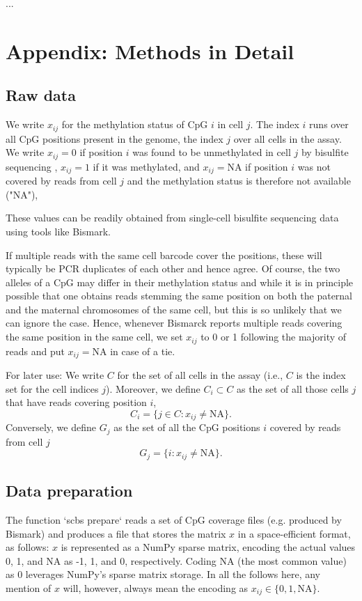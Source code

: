 \documentclass[twocolumn,10pt]{article}
\begin{document}
...

\appendix

\section{Appendix: Methods in Detail}

\subsection{Raw data}

We write $x_{ij}$ for the methylation status of CpG $i$ in cell $j$. The index $i$ runs over all CpG positions present in the genome, the index $j$ over all cells in the assay. We write $x_{ij}=0$ if position $i$ was found to be unmethylated in cell $j$ by bisulfite sequencing , $x_{ij}=1$ if it was methylated, and $x_{ij}=\text{NA}$ if position $i$ was not covered by reads from cell $j$ and the methylation status is therefore not available ("NA"),

These values can be readily obtained from single-cell bisulfite sequencing data using tools like Bismark.

If multiple reads with the same cell barcode cover the positions, these will typically be PCR duplicates of each other and hence agree. Of course, the two alleles of a CpG may differ in their methylation status and while it is in principle possible that one obtains reads stemming the same position on both the paternal and the maternal chromosomes of the same cell, but this is so unlikely that we can ignore the case. Hence, whenever Bismarck reports multiple reads covering the same position in the same cell, we set $x_{ij}$ to 0 or 1 following the majority of reads and put $x_{ij}=\text{NA}$ in case of a tie. 

For later use: We write $C$ for the set of all cells in the assay (i.e., $C$ is the index set for the cell indices $j$). Moreover,
we define $C_i\subset C$ as the set of all those cells $j$ that have reads covering position $i$,
$$ C_i=\{j\in C: x_{ij}\neq\text{NA}\}.$$
Conversely, we define $G_j$ as the set of all the CpG positions $i$ covered by reads from cell $j$ 
$$ G_j=\{i: x_{ij}\neq\text{NA}\}.$$

\subsection{Data preparation}

The function `scbs prepare` reads a set of CpG coverage files (e.g. produced by Bismark) and produces a file that stores the matrix $x$ in a space-efficient format, as follows: $x$ is represented as a NumPy sparse matrix, encoding the actual values 0, 1, and NA as -1, 1, and 0, respectively. Coding NA (the most common value) as 0 leverages NumPy's sparse matrix storage. In all the follows here, any mention of $x$ will, however, always mean the encoding as $x_{ij}\in\{0,1,\text{NA}\}$.
\end{document}
